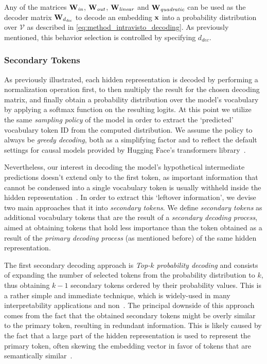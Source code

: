 Any of the matrices $\bm{\mathbf{W}}_\textit{in}$, $\bm{\mathbf{W}}_\textit{out}$, $\bm{\mathbf{W}}_\textit{linear}$ and $\bm{\mathbf{W}}_\textit{quadratic}$ can be used as the decoder matrix $\bm{\mathbf{W}}_{d_\textit{dec}}$ to decode an embedding $\bm{\mathbf{x}}$ into a probability distribution over $\mathcal{V}$ as described in \cref{eq:method_intravisto_decoding}.
As previously mentioned, this behavior selection is controlled by specifying $d_\textit{dec}$.

\subsubsection{Secondary Tokens}\label{sssec:method_intravisto_decoding_tokens}
    
As previously illustrated, each hidden representation is decoded by performing a normalization operation first, to then multiply the result for the chosen decoding matrix, and finally obtain a probability distribution over the model's vocabulary by applying a softmax function on the resulting logits.
At this point we utilize the same \emph{sampling policy} of the model in order to extract the `predicted' vocabulary token ID from the computed distribution.
We assume the policy to always be \emph{greedy decoding}, both as a simplifying factor and to reflect the default settings for causal models provided by Hugging Face's transformers library~\cite{wolf2020}.

Nevertheless, our interest in decoding the model's hypothetical intermediate predictions doesn't extend only to the first token, as important information that cannot be condensed into a single vocabulary token is usually withheld inside the hidden representation~\cite{elhage2022,henighan2023,elhage2023}.
In order to extract this `leftover information', we devise two main approaches that  it into \emph{secondary tokens}.
We define \emph{secondary tokens} as additional vocabulary tokens that are the result of a \emph{secondary decoding process}, aimed at obtaining tokens that hold less importance than the token obtained as a result of the \emph{primary decoding process} (as mentioned before) of the same hidden representation.

The first secondary decoding approach is \emph{Top-$k$ probability decoding} and consists of expanding the number of selected tokens from the probability distribution to $k$, thus obtaining $k-1$ secondary tokens ordered by their probability values.
This is a rather simple and immediate technique, which is widely-used in many interpretability applications and non~\cite{belrose2023a,pal2023,tufanov2024}.
The principal downside of this approach comes from the fact that the obtained secondary tokens might be overly similar to the primary token, resulting in redundant information.
This is likely caused by the fact that a large part of the hidden representation is used to represent the primary token, often skewing the embedding vector in favor of tokens that are semantically similar~\cite{elhage2022}.

